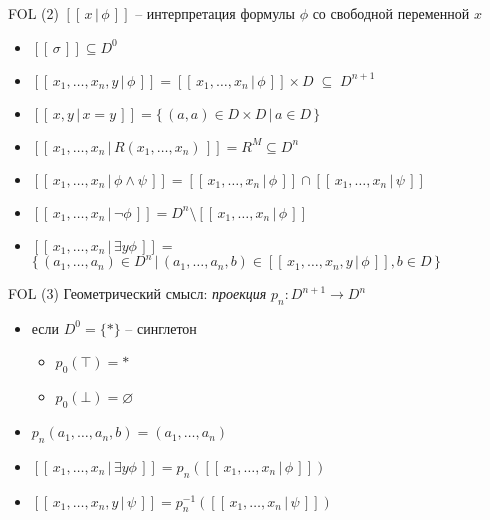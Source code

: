 \documentclass{beamer}
\begin{document}
\begin{frame}{FOL (2)}
$[ \! [ \, x \, \vert \, \phi \, ] \! ]$ -- интерпретация формулы $\phi$ со свободной переменной $x$\\
\bigskip
\begin{small}
\begin{itemize}
	\item $[ \! [ \, \sigma \, ] \! ] \subseteq D^0$ 
	\item $[ \! [ \, x_1, \ldots, x_n, y \, \vert \, \phi \, ] \! ] = [ \! [ \, x_1, \ldots, x_n \, \vert \, \phi \, ] \! ] \times D \; \subseteq \; D^{n+1}$ 
	\item $[ \! [ \, x, y \, \vert \, x = y \, ] \! ] = \{ \, (a, a) \in D \times D \, \vert \, a \in D \, \}$ 
	\item $[ \! [ \, x_1, \ldots, x_n \, \vert \, R(x_1, \ldots, x_n) \, ] \! ] = R^M \subseteq D^n$ 
	\item $[ \! [ \, x_1, \ldots, x_n \, \vert \, \phi \wedge \psi \, ] \! ] = [ \! [ \, x_1, \ldots, x_n \, \vert \, \phi \, ] \! ] \cap [ \! [ \, x_1, \ldots, x_n \, \vert \, \psi \, ] \! ]$ 
	\item $[ \! [ \, x_1, \ldots, x_n \, \vert \, \neg \phi \, ] \! ] = D^n \setminus [ \! [ \, x_1, \ldots, x_n \, \vert \, \phi \, ] \! ]$
	\item $[ \! [ \, x_1, \ldots, x_n \, \vert \, \exists y \phi \, ] \! ] = $\\ \smallskip $\{ \, (a_1, \ldots, a_n) \in D^n \, \vert \, (a_1, \ldots, a_n, b) \in [ \! [ \, x_1, \ldots, x_n, y \, \vert \, \phi \, ] \! ], b \in D \, \}$
\end{itemize}
\end{small}
\end{frame}

\begin{frame}{FOL (3)}
Геометрический смысл: \textit{проекция} $p_n : D^{n+1} \to D^n$\\
\medskip
\begin{itemize}
	\item если $D^0 = \{ * \}$ -- синглетон
		\begin{itemize}
			\item $p_0(\top) = *$
			\item $p_0(\bot) = \varnothing$
		\end{itemize}
	\item {\small $p_n(a_1, \ldots, a_n, b) = (a_1, \ldots, a_n)$}
	\item {\small $[ \! [ \, x_1, \ldots, x_n \, \vert \, \exists y \phi \, ] \! ] = p_n([ \! [ \, x_1, \ldots, x_n \, \vert \, \phi \, ] \! ])$}
	\item {\small $[ \! [ \, x_1, \ldots, x_n, y \, \vert \, \psi \, ] \! ] = p_n^{-1}([ \! [ \, x_1, \ldots, x_n \, \vert \, \psi \, ] \! ])$}
\end{itemize}
\end{frame}
\end{document}
